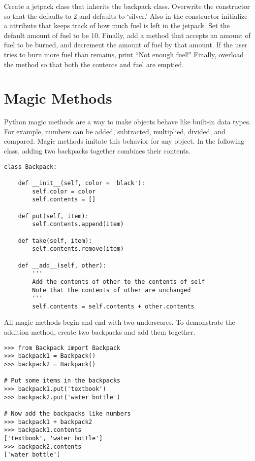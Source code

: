 \begin{problem}

Create a jetpack class that inherits the backpack class.
Overwrite the constructor so that the  defaults to 2 and  defaults to `silver.'
Also in the constructor initialize a  attribute that keeps track of how much fuel is left in the jetpack.
Set the default amount of fuel to be 10.
Finally, add a  method that accepts an amount of fuel to be burned, and decrement the amount of fuel by that amount.
If the user tries to burn more fuel than remains, print ``Not enough fuel!"
Finally, overload the  method so that both the contents and fuel are emptied.
\end{problem}

\section*{Magic Methods}

Python magic methods are a way to make objects behave like built-in data types.
For example, numbers can be added, subtracted, multiplied, divided, and compared.
Magic methods imitate this behavior for any object.
In the following class, adding two backpacks together combines their contents.

\begin{lstlisting}
class Backpack:
	
	def __init__(self, color = 'black'):
		self.color = color
		self.contents = []

	def put(self, item):
		self.contents.append(item)

	def take(self, item):
		self.contents.remove(item)

	def __add__(self, other):
		'''
		Add the contents of other to the contents of self
		Note that the contents of other are unchanged
		'''	
		self.contents = self.contents + other.contents
\end{lstlisting}

All magic methods begin and end with two underscores.
To demonstrate the addition method, create two backpacks and add them together.

\begin{lstlisting}
>>> from Backpack import Backpack
>>> backpack1 = Backpack()
>>> backpack2 = Backpack()

# Put some items in the backpacks
>>> backpack1.put('textbook')
>>> backpack2.put('water bottle')

# Now add the backpacks like numbers
>>> backpack1 + backpack2
>>> backpack1.contents
['textbook', 'water bottle']
>>> backpack2.contents
['water bottle']
\end{lstlisting}

